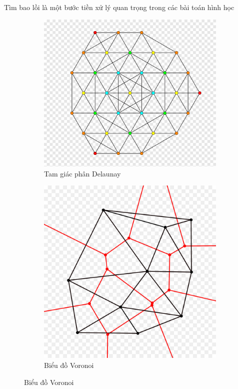 \documentclass[11pt]{beamer}
\theoremstyle{definition}
\theoremstyle{plain}
\theoremstyle{plain}
\theoremstyle{remark}
\begin{document}
	\begin{frame}{Tìm bao lồi là một bước tiền xử lý quan trọng trong các bài toán hình học}
	\begin{figure}
		\centering
		
		\begin{subfigure}[b]{0.4\textwidth}
			\centering
			\includegraphics[width=\textwidth]{tam_giac_phan_delauney}
			\caption{Tam giác phân Delaunay}
			\label{fig:tamgiacphandelaunay}
		\end{subfigure}
		\hfill
		\begin{subfigure}[b]{0.4\textwidth}
			\centering
			\includegraphics[width=\textwidth]{bieu_do_voronoi}
			\caption{Biểu đồ Voronoi}
			\label{fig:bieudovoronoi}
		\end{subfigure}
		\label{fig:boitrihaihinh}
	\end{figure}
	\end{frame}
\end{document}
